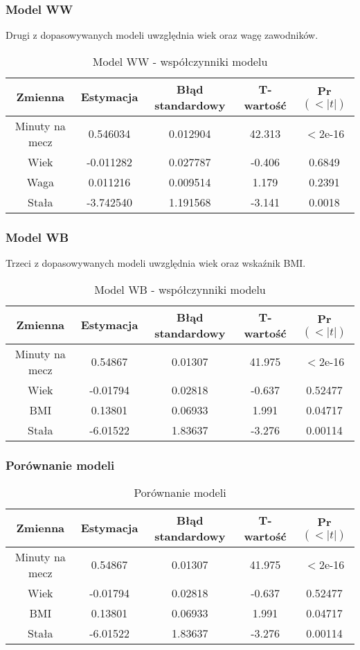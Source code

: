 \documentclass[11pt,a4paper]{article}
\begin{document}
\subsubsection{Model WW}
Drugi z dopasowywanych modeli uwzględnia wiek oraz wagę zawodników. 

\begin{table}[H]
	\begin{tabular}{| c | c | c | c | c |}
		\hline
		Zmienna & Estymacja & Błąd standardowy & T-wartość & Pr$(<|t|)$\\ \hline
		Minuty na mecz & 0.546034 & 0.012904 & 42.313 & $<$2e-16\\ \hline
		Wiek & -0.011282 & 0.027787 & -0.406 & 0.6849 \\ \hline 
		Waga & 0.011216 & 0.009514 & 1.179 & 0.2391\\ \hline
		Stała & -3.742540 & 1.191568 & -3.141 & 0.0018\\ \hline
	\end{tabular}
	\caption{Model WW - współczynniki modelu}
\end{table}

\subsubsection{Model WB}
Trzeci z dopasowywanych modeli uwzględnia wiek oraz wskaźnik BMI. 

\begin{table}[H]
	\begin{tabular}{| c | c | c | c | c |}
		\hline
		Zmienna & Estymacja & Błąd standardowy & T-wartość & Pr$(<|t|)$\\ \hline
		Minuty na mecz & 0.54867 & 0.01307 & 41.975 & $<$2e-16\\ \hline
		Wiek & -0.01794 & 0.02818 & -0.637 & 0.52477\\ \hline 
		BMI & 0.13801 & 0.06933 & 1.991 & 0.04717\\ \hline  
		Stała & -6.01522 & 1.83637 & -3.276 & 0.00114\\ \hline	
	\end{tabular}
	\caption{Model WB - współczynniki modelu}
\end{table}
\subsubsection{Porównanie modeli}
\begin{table}[H]
	\begin{tabular}{| c | c | c | c | c |}
		\hline
		Zmienna & Estymacja & Błąd standardowy & T-wartość & Pr$(<|t|)$\\ \hline
		Minuty na mecz & 0.54867 & 0.01307 & 41.975 & $<$2e-16\\ \hline
		Wiek & -0.01794 & 0.02818 & -0.637 & 0.52477\\ \hline 
		BMI & 0.13801 & 0.06933 & 1.991 & 0.04717\\ \hline  
		Stała & -6.01522 & 1.83637 & -3.276 & 0.00114\\ \hline	
	\end{tabular}
	\caption{Porównanie modeli}
\end{table}
\end{document}
